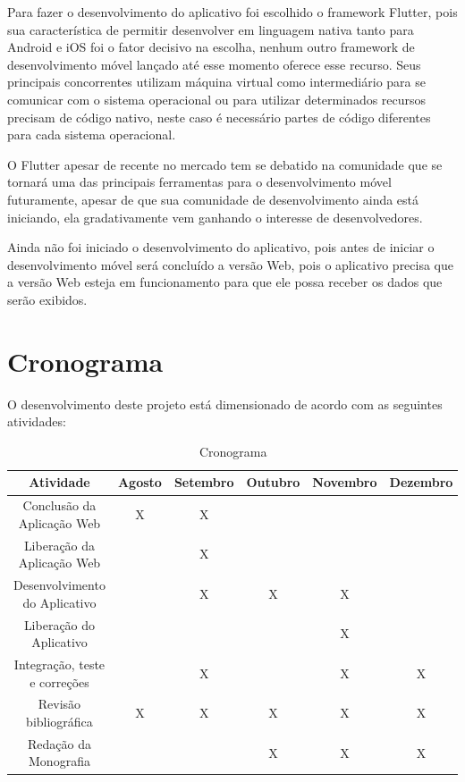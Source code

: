 \documentclass{ifto-tex}
\begin{document}
Para fazer o desenvolvimento do aplicativo foi escolhido o framework Flutter, pois sua característica de permitir desenvolver em linguagem nativa tanto para Android e iOS foi o fator decisivo na escolha, nenhum outro framework de desenvolvimento móvel lançado até esse momento oferece esse recurso. Seus principais concorrentes utilizam máquina virtual como intermediário para se comunicar com o sistema operacional ou para utilizar determinados recursos precisam de código nativo, neste caso é necessário partes de código diferentes para cada sistema operacional.

O Flutter apesar de recente no mercado tem se debatido na comunidade que se tornará uma das principais ferramentas para o desenvolvimento móvel futuramente, apesar de que sua comunidade de desenvolvimento ainda está iniciando, ela gradativamente vem ganhando o interesse de desenvolvedores.

Ainda não foi iniciado o desenvolvimento do aplicativo, pois antes de iniciar o desenvolvimento móvel será concluído a versão Web, pois o aplicativo precisa que a versão Web esteja em funcionamento para que ele possa receber os dados que serão exibidos.

\chapter{Cronograma}
O desenvolvimento deste projeto está dimensionado de acordo com as seguintes atividades:
\begin{table}[h]
	\begin{tabular}{|c|c|c|c|c|c|}
		\hline
		Atividade                             & Agosto & Setembro & Outubro & Novembro & Dezembro \\
		\hline
		Conclusão da Aplicação Web            & X      & X        &         &          &          \\
		\hline
		Liberação da Aplicação Web &        & X        &         &          &          \\
		\hline
		Desenvolvimento do Aplicativo          &        & X        & X       & X        &          \\
		\hline
		Liberação do Aplicativo &        &          &         & X        &          \\
		\hline
		Integração, teste e correções         &        & X        &         & X        & X        \\
		\hline
		Revisão bibliográfica                 & X      & X        & X       & X        & X        \\
		\hline
		Redação da Monografia                 &        &          & X       & X        & X       \\
		\hline
	\end{tabular}
\caption{Cronograma}
\end{table}
\end{document}
